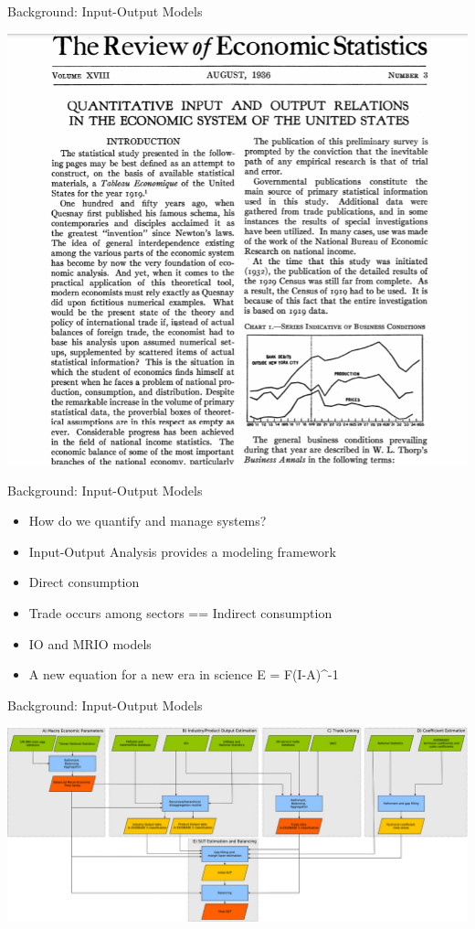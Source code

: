 \documentclass{beamer}
\begin{document}
\begin{frame}{Background: Input-Output Models}

\begin{center}\includegraphics[width=0.5\linewidth]{images/leontief_1936} \end{center}

\end{frame}

\begin{frame}{Background: Input-Output Models}

\begin{itemize}
\item
  How do we quantify and manage systems?
\item
  Input-Output Analysis provides a modeling framework
\item
  Direct consumption
\item
  Trade occurs among sectors == Indirect consumption
\item
  IO and MRIO models
\item
  A new equation for a new era in science E = F(I-A)\^{}-1
\end{itemize}

\end{frame}

\begin{frame}{Background: Input-Output Models}

\begin{center}\includegraphics[width=0.5\linewidth]{images/exiobase3} \end{center}

\end{frame}
\end{document}
